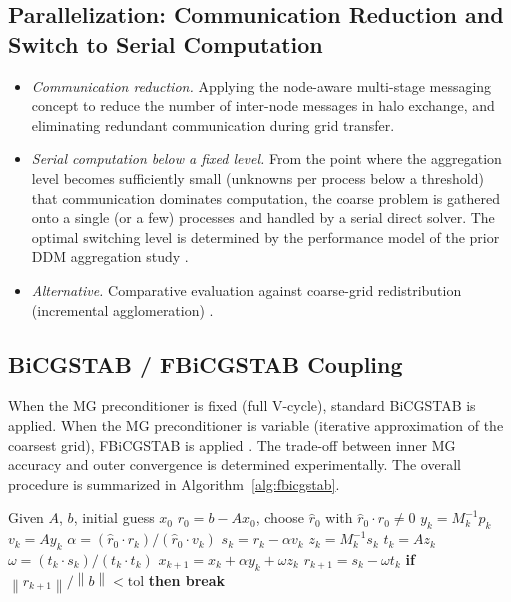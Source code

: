 \documentclass[review]{elsarticle}
\newcommand\norm[1]{\left\lVert#1\right\rVert}
\begin{document}
\subsection{Parallelization: Communication Reduction and Switch to Serial Computation}
\begin{itemize}
  \item \emph{Communication reduction.} Applying the node-aware multi-stage messaging \cite{bienz2020} concept to reduce the number of inter-node messages in halo exchange, and eliminating redundant communication during grid transfer.
  \item \emph{Serial computation below a fixed level.} From the point where the aggregation level becomes sufficiently small (unknowns per process below a threshold) that communication dominates computation, the coarse problem is gathered onto a single (or a few) processes and handled by a serial direct solver. The optimal switching level is determined by the performance model of the prior DDM aggregation study \cite{ha2025aggregation}.
  \item \emph{Alternative.} Comparative evaluation against coarse-grid redistribution (incremental agglomeration) \cite{reisner2018}.
\end{itemize}

\subsection{BiCGSTAB / FBiCGSTAB Coupling}
When the MG preconditioner is fixed (full V-cycle), standard BiCGSTAB is applied. When the MG preconditioner is variable (iterative approximation of the coarsest grid), FBiCGSTAB is applied \cite{chen2016fbicgstab}. The trade-off between inner MG accuracy and outer convergence is determined experimentally. The overall procedure is summarized in Algorithm~\ref{alg:fbicgstab}.

\begin{algorithm}
\caption{FBiCGSTAB with PMG preconditioner}
\label{alg:fbicgstab}
\begin{algorithmic}[1]
\State Given $A$, $b$, initial guess $x_0$
\State $r_0 = b - A x_0$, \quad choose $\hat{r}_0$ with $\hat{r}_0 \cdot r_0 \neq 0$
  \State $y_k = M_k^{-1} p_k$ 
  \State $v_k = A y_k$
  \State $\alpha = (\hat{r}_0 \cdot r_k) / (\hat{r}_0 \cdot v_k)$
  \State $s_k = r_k - \alpha v_k$
  \State $z_k = M_k^{-1} s_k$ 
  \State $t_k = A z_k$
  \State $\omega = (t_k \cdot s_k) / (t_k \cdot t_k)$
  \State $x_{k+1} = x_k + \alpha y_k + \omega z_k$
  \State $r_{k+1} = s_k - \omega t_k$
  \State \textbf{if} $\norm{r_{k+1}} / \norm{b} < \mathrm{tol}$ \textbf{then break}
\EndFor
\end{algorithmic}
\end{algorithm}
\end{document}

